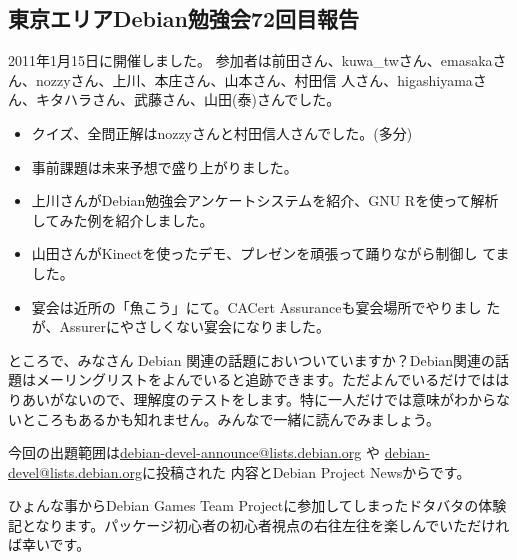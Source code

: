\documentclass[mingoth,a4paper]{jsarticle}
\begin{document}
\subsection{東京エリアDebian勉強会72回目報告}


2011年1月15日に開催しました。
参加者は前田さん、kuwa\_twさん、emasakaさん、nozzyさん、上川、本庄さん、山本さん、村田信
人さん、higashiyamaさん、キタハラさん、武藤さん、山田(泰)さんでした。

\begin{itemize}
 \item クイズ、全問正解はnozzyさんと村田信人さんでした。(多分)
 \item 事前課題は未来予想で盛り上がりました。
 \item 上川さんがDebian勉強会アンケートシステムを紹介、GNU Rを使って解析してみた例を紹介しました。
 \item 山田さんがKinectを使ったデモ、プレゼンを頑張って踊りながら制御し
       てました。
 \item 宴会は近所の「魚こう」にて。CACert Assuranceも宴会場所でやりまし
       たが、Assurerにやさしくない宴会になりました。
\end{itemize}



ところで、みなさん Debian 関連の話題においついていますか？Debian関連の話
題はメーリングリストをよんでいると追跡できます。ただよんでいるだけではは
りあいがないので、理解度のテストをします。特に一人だけでは意味がわからな
いところもあるかも知れません。みんなで一緒に読んでみましょう。

今回の出題範囲は\url{debian-devel-announce@lists.debian.org} や \url{debian-devel@lists.debian.org}に投稿された
内容とDebian Project Newsからです。

\begin{multicols}{2}
 
\end{multicols}



 ひょんな事からDebian Games Team Projectに参加してしまったドタバタの体験記となります。パッケージ初心者の初心者視点の右往左往を楽しんでいただければ幸いです。
\end{document}
